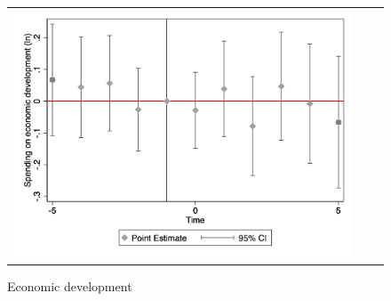 \begin{figure}[!ht]
\begin{tabular}{@{}ccc@{}}
\begin{minipage}[t]{0.32\textwidth}
            \caption{Economic development}
            \includegraphics[width=\linewidth]{images/total population/eventdd_ln_q4_11_step1.jpg}
            \label{fig:ecodev}
        \end{minipage} \\[10pt]


\end{tabular}
\end{figure}
